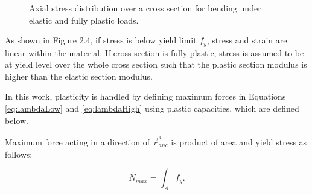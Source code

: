 \begin{figure}[htb!]
\centering
{}
\hspace{1cm}
\caption{Axial stress distribution over a cross section for bending under elastic and fully plastic loads.}
\label{fig:wp}
\end{figure}

As shown in Figure 2.4, if stress is below yield limit $f_y$, stress and strain are linear within the material.
If cross section is fully plastic, stress is assumed to be at yield level over the whole cross section such that 
the plastic section modulus is higher than the elastic section modulus.

In this work, plasticity is handled by defining maximum forces
in Equations \ref{eq:lambdaLow} and  
\ref{eq:lambdaHigh} using plastic capacities, which are defined below.

Maximum force acting in a direction of $\vec{r}_{anc}^{\,i} $
is product of area and yield stress as follows:

\begin{equation} \label{eq:fN}
N_{max}= \int_A f_y.
\end{equation}

